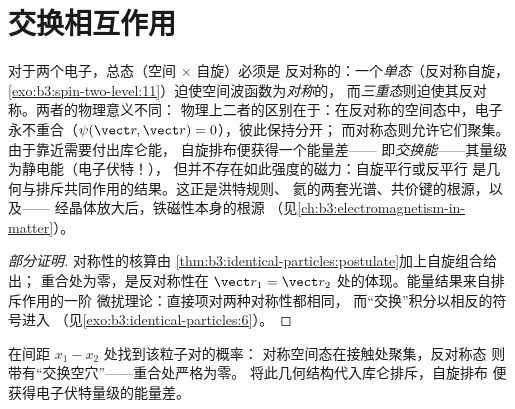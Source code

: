 \section{交换相互作用}

\begin{proposition}[双电子空间态的对称性]\label{prop:b3:identical-particles:exchange-force}
对于两个电子，总态（空间 $\times$ 自旋）必须是
反对称的：一个\emph{单态}（反对称自旋，
\cref{exo:b3:spin-two-level:11}）迫使空间波函数为\emph{对称}的，
而\emph{三重态}则迫使其反对称。两者的物理意义不同：
物理上二者的区别在于：在反对称的空间态中，电子
永不重合（$\psi(\vect r, \vect r) = 0$），彼此保持分开；
而对称态则允许它们聚集。由于靠近需要付出库仑能，
自旋排布便获得一个能量差——
即\emph{交换能}——其量级为静电能（电子伏特！），
但并不存在如此强度的磁力：自旋平行或反平行
是几何与排斥共同作用的结果。这正是洪特规则、
氦的两套光谱、共价键的根源，以及——
经晶体放大后，铁磁性本身的根源
（见\cref{ch:b3:electromagnetism-in-matter}）。
\end{proposition}

\begin{proof}[部分证明]
对称性的核算由
\cref{thm:b3:identical-particles:postulate}加上自旋组合给出；
重合处为零，是反对称性在
$\vect r_1 = \vect r_2$ 处的体现。能量结果来自排斥作用的一阶
微扰理论：直接项对两种对称性都相同，
而“交换”积分以相反的符号进入
（见\cref{exo:b3:identical-particles:6}）。
\end{proof}

\begin{omfigure}

{\small 在间距 $x_1 - x_2$ 处找到该粒子对的概率：
对称空间态在接触处聚集，反对称态
则带有“交换空穴”——重合处严格为零。
将此几何结构代入库仑排斥，自旋排布
便获得电子伏特量级的能量差。}
\end{omfigure}

